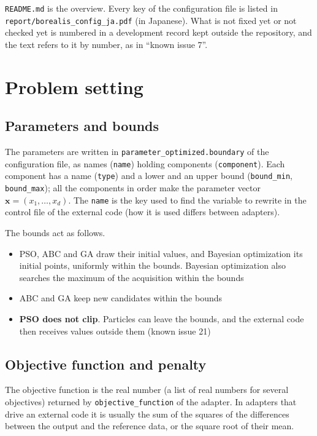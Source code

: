 \documentclass[11pt,a4paper]{article}
\begin{document}
\texttt{README.md} is the overview. Every key of the configuration file is listed in \texttt{report/borealis\_config\_ja.pdf} (in Japanese). What is not fixed yet or not checked yet is numbered in a development record kept outside the repository, and the text refers to it by number, as in ``known issue 7''.

\section{Problem setting}\label{sec:problem}

\subsection{Parameters and bounds}

The parameters are written in \texttt{parameter\_optimized.boundary} of the configuration file, as names (\texttt{name}) holding components (\texttt{component}). Each component has a name (\texttt{type}) and a lower and an upper bound (\texttt{bound\_min}, \texttt{bound\_max}); all the components in order make the parameter vector $\mathbf{x} = (x_1, \dots, x_d)$. The \texttt{name} is the key used to find the variable to rewrite in the control file of the external code (how it is used differs between adapters).

The bounds act as follows.

\begin{itemize}
\item PSO, ABC and GA draw their initial values, and Bayesian optimization its initial points, uniformly within the bounds. Bayesian optimization also searches the maximum of the acquisition within the bounds
\item ABC and GA keep new candidates within the bounds
\item \textbf{PSO does not clip}. Particles can leave the bounds, and the external code then receives values outside them (known issue 21)
\end{itemize}

\subsection{Objective function and penalty}

The objective function is the real number (a list of real numbers for several objectives) returned by \texttt{objective\_function} of the adapter. In adapters that drive an external code it is usually the sum of the squares of the differences between the output and the reference data, or the square root of their mean.
\end{document}
